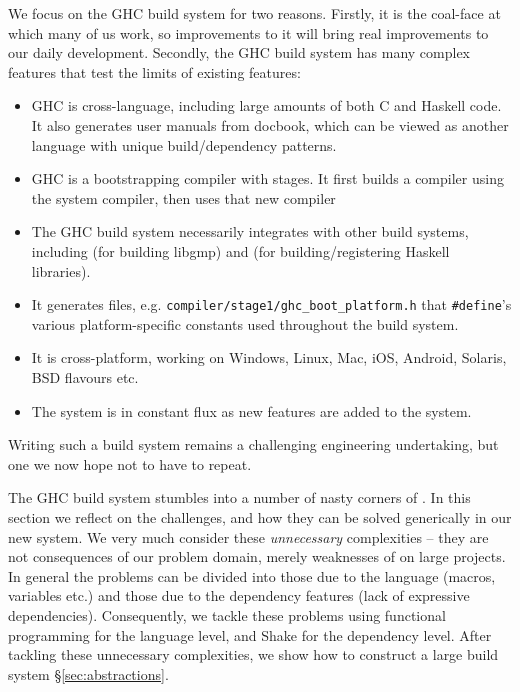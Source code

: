 We focus on the GHC build system for two reasons. Firstly, it is the coal-face
at which many of us work, so improvements to it will bring real improvements to
our daily development. Secondly, the GHC build system has many complex features
that test the limits of existing features:

\begin{itemize}
\item GHC is cross-language, including large amounts of both C and Haskell code.
It also generates user manuals from docbook, which can be viewed as another
language with unique build/dependency patterns.
\item GHC is a bootstrapping compiler with stages. It first builds a compiler
using the system compiler, then uses that new compiler
\item The GHC build system necessarily integrates with other build systems,
including \make{} (for building libgmp) and \cabal{} (for building/registering
Haskell libraries).
\item It generates files, e.g. \texttt{compiler/stage1/ghc\_boot\_platform.h}
that \texttt{\#define}'s various platform-specific constants used throughout the
build system.
\item It is cross-platform, working on Windows, Linux, Mac, iOS, Android,
Solaris, BSD flavours etc.
\item The system is in constant flux as new features are added to the system.
\end{itemize}

Writing such a build system remains a challenging engineering undertaking, but
one we now hope not to have to repeat.

The GHC build system stumbles into a number of nasty corners of \make{}. In this section we reflect on the challenges, and how they can be solved generically in our new system. We very much consider these \textit{unnecessary} complexities -- they are not consequences of our problem domain, merely weaknesses of \make{} on large projects. In general the problems can be divided into those due to the \make{} language (macros, variables etc.) and those due to the \make{} dependency features (lack of expressive dependencies). Consequently, we tackle these problems using functional programming for the language level, and Shake for the dependency level. After tackling these unnecessary complexities, we show how to construct a large build system \S\ref{sec:abstractions}.
